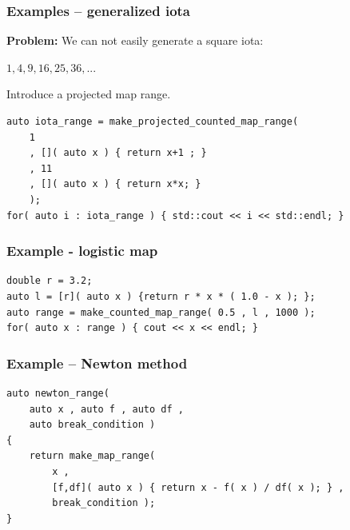 \documentclass{beamer}
\newcommand{\heading}[1]{\frametitle{#1}}
\begin{document}
\begin{frame}[fragile]
  \heading{Examples -- generalized iota}
  
  \textbf{Problem:} We can not easily generate a square iota:
 
  $1,4,9,16,25,36,...$
    
  \pause
 
  Introduce a projected map range.
  
  \begin{lstlisting}[basicstyle=\scriptsize\ttfamily]
auto iota_range = make_projected_counted_map_range(
    1 
    , []( auto x ) { return x+1 ; }
    , 11
    , []( auto x ) { return x*x; }
    );
for( auto i : iota_range ) { std::cout << i << std::endl; }
  \end{lstlisting}


\end{frame}

\begin{frame}[fragile]

  \heading{Example - logistic map}

\begin{lstlisting}[basicstyle=\scriptsize\ttfamily]
double r = 3.2;
auto l = [r]( auto x ) {return r * x * ( 1.0 - x ); };
auto range = make_counted_map_range( 0.5 , l , 1000 );
for( auto x : range ) { cout << x << endl; }
\end{lstlisting}
 
\end{frame}


\begin{frame}[fragile]
 \heading{Example -- Newton method}
 
\begin{lstlisting}[basicstyle=\scriptsize\ttfamily]
auto newton_range(
    auto x , auto f , auto df ,
    auto break_condition )
{
    return make_map_range(
        x ,
        [f,df]( auto x ) { return x - f( x ) / df( x ); } ,
        break_condition );
}
\end{lstlisting}

\end{frame}
\end{document}
